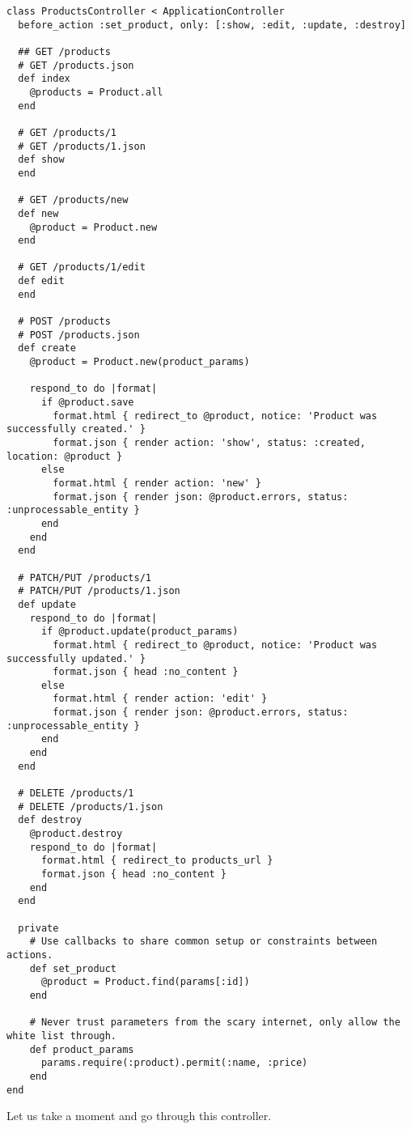 \documentclass[a4paper]{book}
\begin{document}
\begin{shaded}\begin{verbatim}
class ProductsController < ApplicationController
  before_action :set_product, only: [:show, :edit, :update, :destroy]

  ## GET /products
  # GET /products.json
  def index
    @products = Product.all
  end

  # GET /products/1
  # GET /products/1.json
  def show
  end

  # GET /products/new
  def new
    @product = Product.new
  end

  # GET /products/1/edit
  def edit
  end

  # POST /products
  # POST /products.json
  def create
    @product = Product.new(product_params)

    respond_to do |format|
      if @product.save
        format.html { redirect_to @product, notice: 'Product was successfully created.' }
        format.json { render action: 'show', status: :created, location: @product }
      else
        format.html { render action: 'new' }
        format.json { render json: @product.errors, status: :unprocessable_entity }
      end
    end
  end

  # PATCH/PUT /products/1
  # PATCH/PUT /products/1.json
  def update
    respond_to do |format|
      if @product.update(product_params)
        format.html { redirect_to @product, notice: 'Product was successfully updated.' }
        format.json { head :no_content }
      else
        format.html { render action: 'edit' }
        format.json { render json: @product.errors, status: :unprocessable_entity }
      end
    end
  end

  # DELETE /products/1
  # DELETE /products/1.json
  def destroy
    @product.destroy
    respond_to do |format|
      format.html { redirect_to products_url }
      format.json { head :no_content }
    end
  end

  private
    # Use callbacks to share common setup or constraints between actions.
    def set_product
      @product = Product.find(params[:id])
    end

    # Never trust parameters from the scary internet, only allow the white list through.
    def product_params
      params.require(:product).permit(:name, :price)
    end
end
\end{verbatim}\end{shaded}

Let us take a moment and go through this controller.
\end{document}
